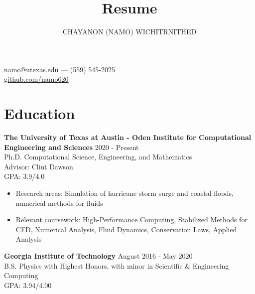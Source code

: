 \documentclass[10pt]{article}
\makeatletter
\renewcommand{\maketitle}{
  \begin{center}
    {\Large\bfseries\theauthor}

    namo@utexas.edu --- (559) 545-2025 \\
    \url{github.com/namo626}
  \end{center}
}
\newenvironment{body}{}
\makeatother
\begin{document}
\title{Resume}
\author{CHAYANON (NAMO) WICHITRNITHED}
\maketitle

\section{Education}
\begin{body}
  \textbf{The University of Texas at Austin - Oden Institute for Computational Engineering and Sciences} \hfill 2020 - Present \\
   Ph.D. Computational Science, Engineering, and Mathematics \\
   Advisor: Clint Dawson \\
    GPA: 3.9/4.0
  \begin{itemize}[leftmargin=*]
    \setlength\itemsep{-0.3em}
    \item Research areas: Simulation of hurricane storm surge and coastal floods, numerical methods for fluids
    \item Relevant coursework: High-Performance Computing, Stabilized Methods for CFD, Numerical Analysis, Fluid Dynamics, Conservation Laws, Applied Analysis
  \end{itemize}

\noindent
  \textbf{Georgia Institute of Technology} \hfill August 2016 - May 2020 \\
  B.S. Physics with Highest Honors, with minor in Scientific \& Engineering Computing \\
  GPA: 3.94/4.00
\end{body}
\end{document}
